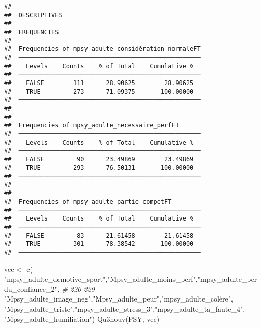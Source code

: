 \documentclass[
]{article}
\newenvironment{Shaded}{\begin{snugshade}}{\end{snugshade}}
\newcommand{\CommentTok}[1]{\textcolor[rgb]{0.56,0.35,0.01}{\textit{#1}}}
\newcommand{\FunctionTok}[1]{\textcolor[rgb]{0.00,0.00,0.00}{#1}}
\newcommand{\NormalTok}[1]{#1}
\newcommand{\OtherTok}[1]{\textcolor[rgb]{0.56,0.35,0.01}{#1}}
\newcommand{\StringTok}[1]{\textcolor[rgb]{0.31,0.60,0.02}{#1}}
\begin{document}
\begin{verbatim}
## 
##  DESCRIPTIVES
## 
##  FREQUENCIES
## 
##  Frequencies of mpsy_adulte_considération_normaleFT 
##  ────────────────────────────────────────────────── 
##    Levels    Counts    % of Total    Cumulative %   
##  ────────────────────────────────────────────────── 
##    FALSE        111      28.90625        28.90625   
##    TRUE         273      71.09375       100.00000   
##  ────────────────────────────────────────────────── 
## 
## 
##  Frequencies of mpsy_adulte_necessaire_perfFT       
##  ────────────────────────────────────────────────── 
##    Levels    Counts    % of Total    Cumulative %   
##  ────────────────────────────────────────────────── 
##    FALSE         90      23.49869        23.49869   
##    TRUE         293      76.50131       100.00000   
##  ────────────────────────────────────────────────── 
## 
## 
##  Frequencies of mpsy_adulte_partie_competFT         
##  ────────────────────────────────────────────────── 
##    Levels    Counts    % of Total    Cumulative %   
##  ────────────────────────────────────────────────── 
##    FALSE         83      21.61458        21.61458   
##    TRUE         301      78.38542       100.00000   
##  ──────────────────────────────────────────────────
\end{verbatim}

\begin{Shaded}
\begin{Highlighting}[]
\NormalTok{vec }\OtherTok{\textless{}{-}} \FunctionTok{c}\NormalTok{( }\StringTok{"mpsy\_adulte\_demotive\_sport"}\NormalTok{,}\StringTok{"Mpsy\_adulte\_moins\_perf"}\NormalTok{,}\StringTok{"mpsy\_adulte\_perdu\_confiance\_2"}\NormalTok{,  }\CommentTok{\# 220{-}229}
     \StringTok{"Mpsy\_adulte\_image\_neg"}\NormalTok{,}\StringTok{"Mpsy\_adulte\_peur"}\NormalTok{,}\StringTok{"mpsy\_adulte\_colère"}\NormalTok{,}
     \StringTok{"Mpsy\_adulte\_triste"}\NormalTok{,}\StringTok{"mpsy\_adulte\_stress\_3"}\NormalTok{,}\StringTok{"mpsy\_adulte\_ta\_faute\_4"}\NormalTok{,}
     \StringTok{"Mpsy\_adulte\_humiliation"}\NormalTok{)}
\FunctionTok{Qu3nouv}\NormalTok{(PSY, vec)}
\end{Highlighting}
\end{Shaded}
\end{document}
